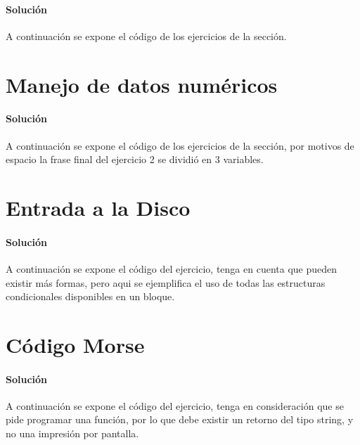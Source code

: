 \documentclass[spanish, fleqn]{scrartcl}
\begin{document}
  \paragraph{Solución}
  A continuación se expone el código de los ejercicios de la sección.
  
  
    
\section{Manejo de datos numéricos}

    \paragraph{Solución}
    A continuación se expone el código de los ejercicios de la sección, por motivos de espacio la frase final del ejercicio 2 se dividió en 3 variables.
    
    

\section{Entrada a la Disco}

    \paragraph{Solución}
    A continuación se expone el código del ejercicio, tenga en cuenta que pueden existir más formas, pero aqui se ejemplifica el uso de todas las estructuras condicionales disponibles en un bloque.
    
    
    
\section{Código Morse}

    \paragraph{Solución}
    A continuación se expone el código del ejercicio, tenga en consideración que se pide programar una función, por lo que debe existir un retorno del tipo string, y no una impresión por pantalla.
    
    
    
\end{document}

